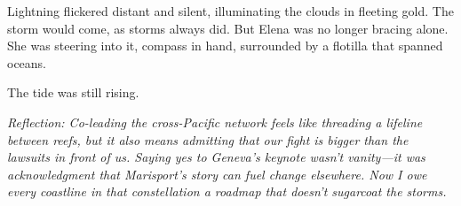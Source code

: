 Lightning flickered distant and silent, illuminating the clouds in fleeting gold. The storm would come, as storms always did. But Elena was no longer bracing alone. She was steering into it, compass in hand, surrounded by a flotilla that spanned oceans.

The tide was still rising.

\noindent\textit{Reflection: Co-leading the cross-Pacific network feels like threading a lifeline between reefs, but it also means admitting that our fight is bigger than the lawsuits in front of us. Saying yes to Geneva's keynote wasn't vanity—it was acknowledgment that Marisport's story can fuel change elsewhere. Now I owe every coastline in that constellation a roadmap that doesn't sugarcoat the storms.}
